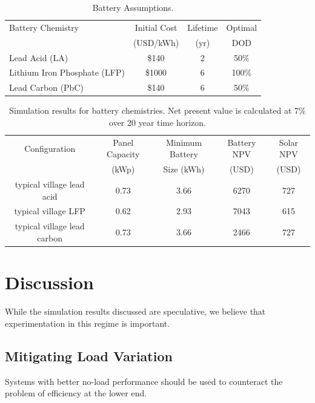 \documentclass[conference]{IEEEtran}
\begin{document}
\begin{table}
\centering
\begin{tabular}{@{} l %
                c %
                c %
                c @{}}

Battery Chemistry & Initial Cost & Lifetime & Optimal \\ 
                  & (USD/kWh)    & (yr)      & DOD\\
Lead Acid (LA)               & \$140  & 2  &  50\%  \\
Lithium Iron Phosphate (LFP) & \$1000 & 6  & 100\%   \\ 
Lead Carbon (PbC)            & \$140  & 6  &  50\%   \\
\end{tabular}
\caption{Battery Assumptions.}
\label{table_battery_assumptions}
\end{table}

\begin{table}[!t]
\centering
\begin{tabular}{ c c c c c }
Configuration & Panel Capacity & Minimum Battery & Battery NPV & Solar NPV \\
              & (kWp)          & Size (kWh)      & (USD)       & (USD)     \\
\hline
typical village lead acid      & 0.73 & 3.66 & 6270 & 727 \\
typical village LFP            & 0.62 & 2.93 & 7043 & 615 \\
typical village lead carbon    & 0.73 & 3.66 & 2466 & 727 \\
\end{tabular}
\caption{Simulation results for battery chemistries.
Net present value is calculated at 7\% over 20 year 
time horizon.}
\label{table_battery}
\end{table}


\section{Discussion}
While the simulation results discussed are speculative, 
we believe that experimentation in this regime is important.

\subsection{Mitigating Load Variation}
Systems with better no-load performance should be used to counteract
the problem of efficiency at the lower end.
\end{document}
